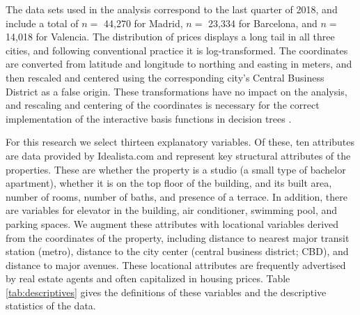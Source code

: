 \documentclass[Royal,times,sageh]{sagej}
\begin{document}
The data sets used in the analysis correspond to the last quarter of
2018, and include a total of \(n=\) 44,270 for Madrid, \(n=\) 23,334 for
Barcelona, and \(n=\) 14,018 for Valencia. The distribution of prices
displays a long tail in all three cities, and following conventional
practice it is log-transformed. The coordinates are converted from
latitude and longitude to northing and easting in meters, and then
rescaled and centered using the corresponding city's Central Business
District as a false origin. These transformations have no impact on the
analysis, and rescaling and centering of the coordinates is necessary
for the correct implementation of the interactive basis functions in
decision trees \citep[see][pp.~188-189]{Paez2019inducing}.

For this research we select thirteen explanatory variables. Of these,
ten attributes are data provided by Idealista.com and represent key
structural attributes of the properties. These are whether the property
is a studio (a small type of bachelor apartment), whether it is on the
top floor of the building, and its built area, number of rooms, number
of baths, and presence of a terrace. In addition, there are variables
for elevator in the building, air conditioner, swimming pool, and
parking spaces. We augment these attributes with locational variables
derived from the coordinates of the property, including distance to
nearest major transit station (metro), distance to the city center
(central business district; CBD), and distance to major avenues. These
locational attributes are frequently advertised by real estate agents
and often capitalized in housing prices. Table \ref{tab:descriptives}
gives the definitions of these variables and the descriptive statistics
of the data.
\end{document}
